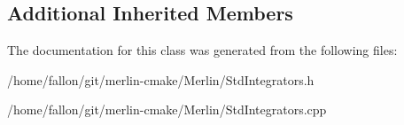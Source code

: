 \subsection*{Additional Inherited Members}


The documentation for this class was generated from the following files\+:\begin{DoxyCompactItemize}
\item 
/home/fallon/git/merlin-\/cmake/\+Merlin/Std\+Integrators.\+h\item 
/home/fallon/git/merlin-\/cmake/\+Merlin/Std\+Integrators.\+cpp\end{DoxyCompactItemize}
